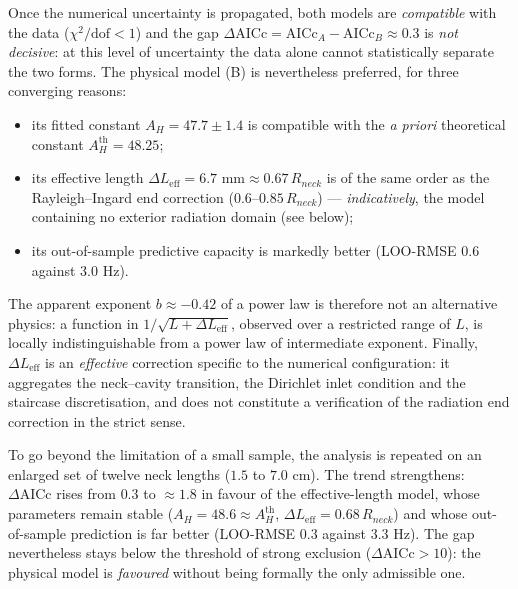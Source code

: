 \documentclass[11pt,a4paper,twocolumn]{article}
\begin{document}
Once the numerical uncertainty is propagated, both models are \emph{compatible} with the data ($\chi^2/\mathrm{dof} < 1$) and the gap $\Delta\text{AICc} = \text{AICc}_A - \text{AICc}_B \approx 0.3$ is \emph{not decisive}: at this level of uncertainty the data alone cannot statistically separate the two forms. The physical model (B) is nevertheless preferred, for three converging reasons:
\begin{itemize}
    \item its fitted constant $A_H = 47.7 \pm 1.4$ is compatible with the \emph{a priori} theoretical constant $A_H^{\mathrm{th}} = 48.25$;
    \item its effective length $\Delta L_{\mathrm{eff}} = 6.7\text{ mm} \approx 0.67\,R_{neck}$ is of the same order as the Rayleigh--Ingard end correction \cite{ingard1953theory} ($0.6$--$0.85\,R_{neck}$) --- \emph{indicatively}, the model containing no exterior radiation domain (see below);
    \item its out-of-sample predictive capacity is markedly better (LOO-RMSE $0.6$ against $3.0$ Hz).
\end{itemize}

The apparent exponent $b \approx -0.42$ of a power law is therefore not an alternative physics: a function in $1/\sqrt{L+\Delta L_{\mathrm{eff}}}$, observed over a restricted range of $L$, is locally indistinguishable from a power law of intermediate exponent. Finally, $\Delta L_{\mathrm{eff}}$ is an \emph{effective} correction specific to the numerical configuration: it aggregates the neck--cavity transition, the Dirichlet inlet condition and the staircase discretisation, and does not constitute a verification of the radiation end correction in the strict sense.

To go beyond the limitation of a small sample, the analysis is repeated on an enlarged set of twelve neck lengths ($1.5$ to $7.0$ cm). The trend strengthens: $\Delta\text{AICc}$ rises from $0.3$ to $\approx 1.8$ in favour of the effective-length model, whose parameters remain stable ($A_H = 48.6 \approx A_H^{\mathrm{th}}$, $\Delta L_{\mathrm{eff}} = 0.68\,R_{neck}$) and whose out-of-sample prediction is far better (LOO-RMSE $0.3$ against $3.3$ Hz). The gap nevertheless stays below the threshold of strong exclusion ($\Delta\text{AICc}>10$): the physical model is \emph{favoured} without being formally the only admissible one.
\end{document}
